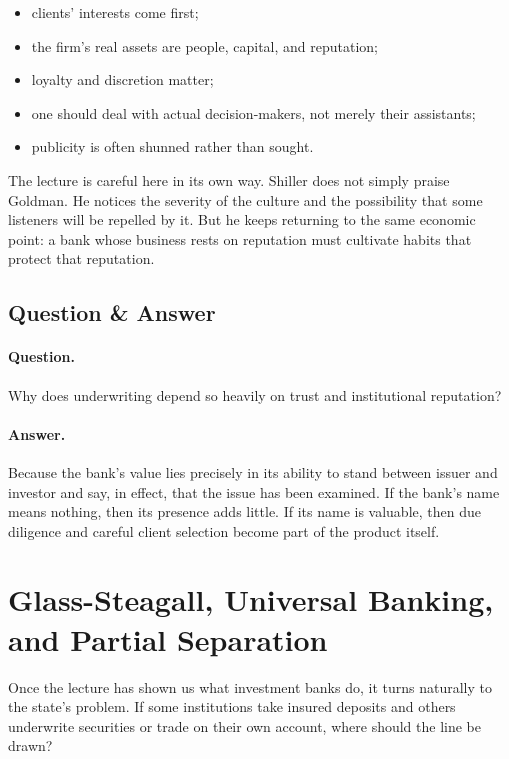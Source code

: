 \begin{itemize}
\item clients' interests come first;
\item the firm's real assets are people, capital, and reputation;
\item loyalty and discretion matter;
\item one should deal with actual decision-makers, not merely their assistants;
\item publicity is often shunned rather than sought.
\end{itemize}

The lecture is careful here in its own way. Shiller does not simply praise Goldman. He notices the severity of the culture and the possibility that some listeners will be repelled by it. But he keeps returning to the same economic point: a bank whose business rests on reputation must cultivate habits that protect that reputation.

\subsection{Question \& Answer}

\paragraph{Question.} Why does underwriting depend so heavily on trust and institutional reputation?

\paragraph{Answer.} Because the bank's value lies precisely in its ability to stand between issuer and investor and say, in effect, that the issue has been examined. If the bank's name means nothing, then its presence adds little. If its name is valuable, then due diligence and careful client selection become part of the product itself.

\section{Glass-Steagall, Universal Banking, and Partial Separation}

Once the lecture has shown us what investment banks do, it turns naturally to the state's problem. If some institutions take insured deposits and others underwrite securities or trade on their own account, where should the line be drawn?

